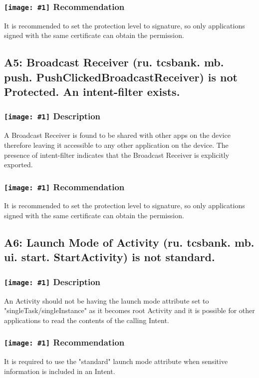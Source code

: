 \documentclass[12p]{article}
\newcommand{\icon}[1]{\texttt{[image: \#1]}}
\begin{document}
\subsubsection*{\protect\icon{/home/miki/Documents/GITHUB/AndroidPermissions/python/vulns/report_icons/basic_todo.png} Recommendation}
It is recommended to set the protection level to signature, so only applications signed with the same certificate can obtain the permission.
\subsection{A5: Broadcast Receiver (ru. tcsbank. mb. push. PushClickedBroadcastReceiver) is not Protected. An intent-filter exists.}
\subsubsection*{\protect\icon{/home/miki/Documents/GITHUB/AndroidPermissions/python/vulns/report_icons/basic_sheet.png} Description}
A  Broadcast Receiver is found to be shared with other apps on the device therefore leaving it accessible to any other application on the device. The presence of intent-filter indicates that the Broadcast Receiver is explicitly exported.
\subsubsection*{\protect\icon{/home/miki/Documents/GITHUB/AndroidPermissions/python/vulns/report_icons/basic_todo.png} Recommendation}
It is recommended to set the protection level to signature, so only applications signed with the same certificate can obtain the permission.
\subsection{A6: Launch Mode of Activity (ru. tcsbank. mb. ui. start. StartActivity) is not standard.}
\subsubsection*{\protect\icon{/home/miki/Documents/GITHUB/AndroidPermissions/python/vulns/report_icons/basic_sheet.png} Description}
An Activity should not be having the launch mode attribute set to "singleTask/singleInstance" as it becomes root Activity and it is possible for other applications to read the contents of the calling Intent.
\subsubsection*{\protect\icon{/home/miki/Documents/GITHUB/AndroidPermissions/python/vulns/report_icons/basic_todo.png} Recommendation}
It is required to use the "standard" launch mode attribute when sensitive information is included in an Intent.
\end{document}
